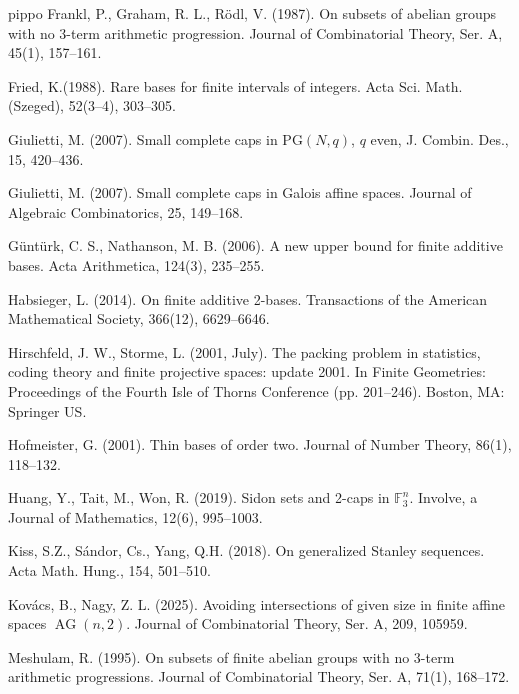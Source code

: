 \documentclass[11pt]{article}
\numberwithin{table}{section}
\newcommand{\F}{{\mathbb F}}
\theoremstyle{definition}
\DeclareMathOperator{\AG}{{AG}}
\begin{document}
{\begin{thebibliography}{pippo}
			Frankl, P., Graham, R. L., Rödl, V. (1987). On subsets of abelian groups with no 3-term arithmetic progression. Journal of Combinatorial Theory, Ser. A, 45(1), 157--161.%
			
			 Fried, K.(1988). Rare bases for finite intervals of integers. Acta Sci. Math.(Szeged), 52(3–4), 303--305.
			
			 Giulietti, M. (2007). Small complete caps in $\mathrm{PG}(N,q)$, $q$ even, J. Combin. Des., 15, 420--436.
			
			Giulietti, M. (2007). Small complete caps in Galois affine spaces. Journal of Algebraic Combinatorics, 25, 149--168.
			
			Güntürk, C. S.,  Nathanson, M. B. (2006). A new upper bound for finite additive bases. Acta Arithmetica, 124(3), 235--255.
			
			 Habsieger, L. (2014). On finite additive 2-bases. Transactions of the American Mathematical Society, 366(12), 6629--6646.
			
			 Hirschfeld, J. W.,  Storme, L. (2001, July). The packing problem in statistics, coding theory and finite projective spaces: update 2001. In Finite Geometries: Proceedings of the Fourth Isle of Thorns Conference (pp. 201--246). Boston, MA: Springer US.
			
			 Hofmeister, G. (2001). Thin bases of order two. Journal of Number Theory, 86(1), 118--132.
			
			 Huang, Y., Tait, M.,  Won, R. (2019). Sidon sets and 2-caps in $\F_3^n$. Involve, a Journal of Mathematics, 12(6), 995--1003.
			
			
			   Kiss, S.Z.,   Sándor, Cs., Yang,  Q.H. (2018).  On generalized Stanley sequences. Acta Math. Hung., 154, 501--510.
			
			 Kovács, B., Nagy, Z. L. (2025). Avoiding intersections of given size in finite affine spaces $\AG(n, 2)$. Journal of Combinatorial Theory, Ser. A, 209,
			105959.
			
			Meshulam, R. (1995). On subsets of finite abelian groups with no 3-term arithmetic progressions. Journal of Combinatorial Theory, Ser. A, 71(1), 168--172.
			

\end{thebibliography}}
\end{document}
